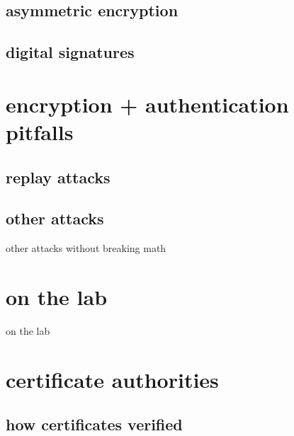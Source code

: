 \subsection{asymmetric encryption}



\subsection{digital signatures}



\section{encryption + authentication pitfalls}



\subsection{replay attacks}




\subsection{other attacks}

\begin{frame}{other attacks without breaking math}
\end{frame}



\section{on the lab}
\begin{frame}{on the lab}
\end{frame}

\section{certificate authorities}



\subsection{how certificates verified}


